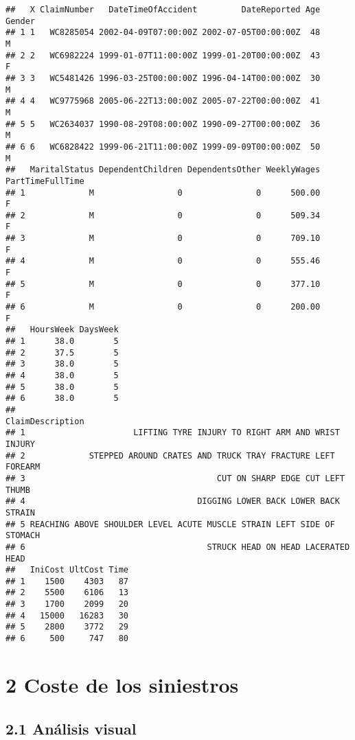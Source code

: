 \documentclass[
  a4paper]{article}
\begin{document}
\begin{verbatim}
##   X ClaimNumber   DateTimeOfAccident         DateReported Age Gender
## 1 1   WC8285054 2002-04-09T07:00:00Z 2002-07-05T00:00:00Z  48      M
## 2 2   WC6982224 1999-01-07T11:00:00Z 1999-01-20T00:00:00Z  43      F
## 3 3   WC5481426 1996-03-25T00:00:00Z 1996-04-14T00:00:00Z  30      M
## 4 4   WC9775968 2005-06-22T13:00:00Z 2005-07-22T00:00:00Z  41      M
## 5 5   WC2634037 1990-08-29T08:00:00Z 1990-09-27T00:00:00Z  36      M
## 6 6   WC6828422 1999-06-21T11:00:00Z 1999-09-09T00:00:00Z  50      M
##   MaritalStatus DependentChildren DependentsOther WeeklyWages PartTimeFullTime
## 1             M                 0               0      500.00                F
## 2             M                 0               0      509.34                F
## 3             M                 0               0      709.10                F
## 4             M                 0               0      555.46                F
## 5             M                 0               0      377.10                F
## 6             M                 0               0      200.00                F
##   HoursWeek DaysWeek
## 1      38.0        5
## 2      37.5        5
## 3      38.0        5
## 4      38.0        5
## 5      38.0        5
## 6      38.0        5
##                                                         ClaimDescription
## 1                      LIFTING TYRE INJURY TO RIGHT ARM AND WRIST INJURY
## 2             STEPPED AROUND CRATES AND TRUCK TRAY FRACTURE LEFT FOREARM
## 3                                       CUT ON SHARP EDGE CUT LEFT THUMB
## 4                                   DIGGING LOWER BACK LOWER BACK STRAIN
## 5 REACHING ABOVE SHOULDER LEVEL ACUTE MUSCLE STRAIN LEFT SIDE OF STOMACH
## 6                                     STRUCK HEAD ON HEAD LACERATED HEAD
##   IniCost UltCost Time
## 1    1500    4303   87
## 2    5500    6106   13
## 3    1700    2099   20
## 4   15000   16283   30
## 5    2800    3772   29
## 6     500     747   80
\end{verbatim}

\hypertarget{coste-de-los-siniestros}{%
\section{2 Coste de los siniestros}\label{coste-de-los-siniestros}}

\hypertarget{anuxe1lisis-visual}{%
\subsection{2.1 Análisis visual}\label{anuxe1lisis-visual}}
\end{document}
